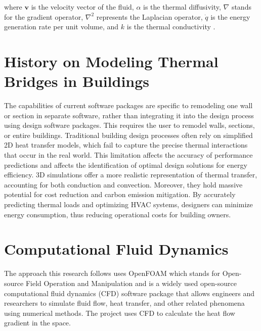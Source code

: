 where $\mathbf{v}$ is the velocity vector of the fluid, $\alpha$ is the thermal diffusivity, $\nabla$ stands for the gradient operator, $\nabla^2$ represents the Laplacian operator, $\dot{q}$ is the energy generation rate per unit volume, and $k$ is the thermal conductivity \cite{bergman2011fundamentals}.



\section{History on Modeling Thermal Bridges in Buildings}
The capabilities of current software packages are specific to remodeling one wall or section in separate software, rather than integrating it into the design process using design software packages. 
This requires the user to remodel walls, sections, or entire buildings.
Traditional building design processes often rely on simplified 2D heat transfer models, which fail to capture the precise thermal interactions that occur in the real world. This limitation affects the accuracy of performance predictions and affects the identification of optimal design solutions for energy efficiency. 
3D simulations offer a more realistic representation of thermal transfer, accounting for both conduction and convection. 
Moreover, they hold massive potential for cost reduction and carbon emission mitigation. 
By accurately predicting thermal loads and optimizing HVAC systems, designers can minimize energy consumption, thus reducing operational costs for building owners. 













\section{Computational Fluid Dynamics}
The approach this research follows uses OpenFOAM which stands for Open-source Field Operation and Manipulation and is a widely used open-source computational fluid dynamics  (CFD) software package that allows engineers and researchers to simulate fluid flow, heat transfer, and other related phenomena using numerical methods. The project uses CFD to calculate the heat flow gradient in the space.



